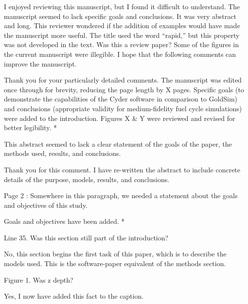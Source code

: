 \documentclass[answers,12pt]{exam}
\begin{document}
\begin{questions}
\question I enjoyed reviewing this manuscript, but I found it difficult to understand.
The manuscript seemed to lack specific goals and conclusions. It was very
abstract and long.  This reviewer wondered if the addition of examples would
have made the manuscript more useful. The title used the word “rapid,” but this
property was not developed in the text. Was this a review paper? Some of the
figures in the current manuscript were illegible. I hope that the following
comments can improve the manuscript.
\begin{solution}
Thank you for your particularly detailed comments. The manuscript was edited 
        once through for brevity, reducing the page length by X pages. Specific 
        goals (to demonstrate the capabilities of the Cyder software in 
        comparison to GoldSim) and conclusions (appropriate validity for 
        medium-fidelity fuel cycle simulations) were added to the introduction. 
        Figures X \& Y were reviewed and revised for better legibility.
        {\color{red}*}
\end{solution}

\question This abstract seemed to lack a clear statement of the goals of the paper, the methods used, results, and conclusions.
\begin{solution}
Thank you for this comment. I have re-written the abstract to include concrete 
details of the purpose, models, results, and conclusions. 
\end{solution}

\question Page 2 : Somewhere in this paragraph, we needed a statement about the goals and objectives of this study.
\begin{solution}
Goals and objectives have been added. 
        {\color{red}*}
\end{solution}


\question Line 35. Was this section still part of the introduction?

\begin{solution}
No, this section begins the first task of this paper, which is to describe the 
models used. This is the software-paper equivalent of the methods section.
\end{solution}

\question Figure 1. Was z depth?
\begin{solution}
Yes, I now have added this fact to the caption.
\end{solution}


\end{questions}
\end{document}
